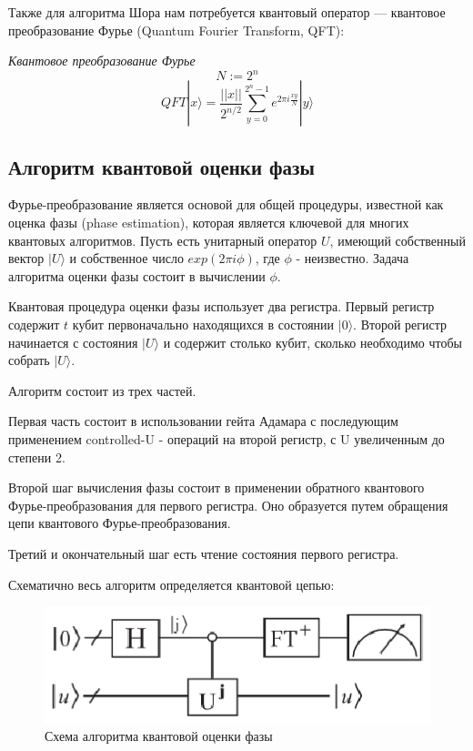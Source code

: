 \documentclass[14pt]{article}
\begin{document}
	\newpage
	
	Также для алгоритма Шора нам потребуется квантовый оператор — квантовое преобразование Фурье (Quantum Fourier Transform, QFT):	

	\textit{Квантовое преобразование Фурье}
	\begin{equation}
		N := 2^n
	\end{equation}
	\begin{equation}
		QFT|x \rangle = \frac{||x||}{2^{n/2}} \sum_{y = 0}^{2^n-1}{e^{2 \pi i \frac{xy}{N}}} |y \rangle
	\end{equation}
	
	\newpage
	\subsection{Алгоритм квантовой оценки фазы}
	
	Фурье-преобразование является основой для общей процедуры, известной как оценка фазы (phase estimation), которая является ключевой для многих квантовых алгоритмов. Пусть есть унитарный оператор $U$, имеющий собственный вектор $|U \rangle$ и собственное число
$exp(2 \pi i \phi)$, где $\phi$ - неизвестно. Задача алгоритма оценки фазы состоит в вычислении $\phi$.

Квантовая процедура оценки фазы использует два регистра. Первый регистр содержит $t$ кубит первоначально находящихся в состоянии $|0 \rangle$. Второй регистр начинается с состояния $|U \rangle$ и содержит столько кубит, сколько необходимо чтобы собрать $|U \rangle$.	

Алгоритм состоит из трех частей.

Первая часть состоит в использовании гейта Адамара с последующим применением
controlled-U - операций на второй регистр, с U увеличенным до степени 2.

Второй шаг вычисления фазы состоит в применении обратного квантового Фурье-преобразования для первого регистра. Оно образуется путем обращения цепи квантового Фурье-преобразования. 

Третий и окончательный шаг есть чтение состояния первого регистра. 

Схематично весь алгоритм определяется квантовой цепью:

	\begin{figure}[h!]
		\centering
		\includegraphics[scale=1.5]{phase}
		\caption{Схема алгоритма квантовой оценки фазы}
	\end{figure}
\end{document}

